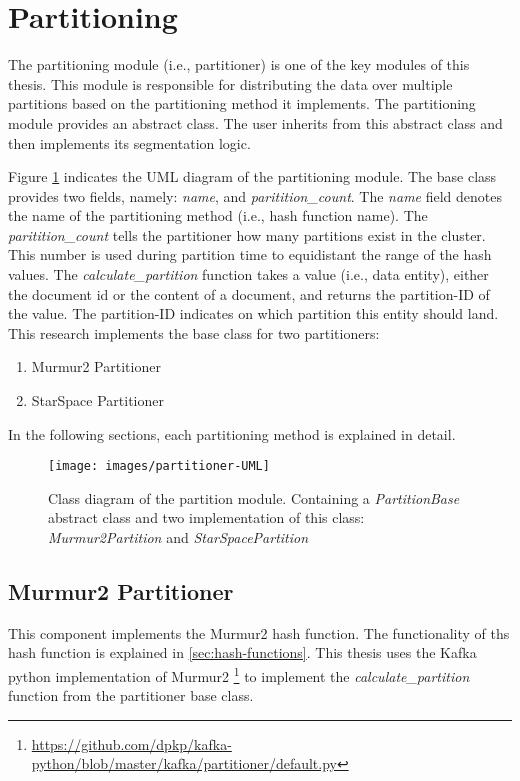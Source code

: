 \section{Partitioning}
\label{sec:partitioning}
The partitioning module (i.e., partitioner) is one of the key modules of this thesis. This module is responsible for distributing the data over multiple partitions based on the partitioning method it implements. The partitioning module provides an abstract class. The user inherits from this abstract class and then implements its segmentation logic. 


Figure \ref{fig:partitioner-uml} indicates the UML diagram of the partitioning module. The base class provides two fields, namely: \emph{name}, and \emph{paritition\_count}. The \emph{name} field denotes the name of the partitioning method (i.e., hash function name). The \emph{paritition\_count} tells the partitioner how many partitions exist in the cluster. This number is used during partition time to equidistant the range of the hash values. The \emph{calculate\_partition} function takes a value (i.e., data entity), either the document id or the content of a document, and returns the partition-ID of the value. The partition-ID indicates on which partition this entity should land. This research implements the base class for two partitioners:

\begin{enumerate}
    \item Murmur2 Partitioner
    \item StarSpace Partitioner
\end{enumerate}

\noindent In the following sections, each partitioning method is explained in detail.

\begin{figure}[!htb]
    \centering
    \texttt{[image: images/partitioner-UML]}
    \caption{Class diagram of the partition module. Containing a \emph{PartitionBase} abstract class and two implementation of this class: \emph{Murmur2Partition} and \emph{StarSpacePartition}}
    \label{fig:partitioner-uml}
\end{figure}


\subsection{Murmur2 Partitioner}
\label{subsec:partitioning-murmur2}
This component implements the Murmur2 hash function. The functionality of ths hash function is explained in \ref{sec:hash-functions}. This thesis uses the Kafka python implementation of Murmur2 \footnote{\url{https://github.com/dpkp/kafka-python/blob/master/kafka/partitioner/default.py}} to implement the \emph{calculate\_partition} function from the partitioner base class.

